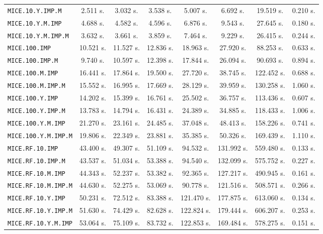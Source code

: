 \begin{table}[htbp]
\begin{tabular}{|l|c|c|c|c|c|c|c|}
\texttt{MICE.10.Y.IMP.M} & 2.511 s. & 3.032 s. & 3.538 s. & 5.007 s. & 6.692 s. & 19.519 s. & 0.210 s. \\
\texttt{MICE.10.Y.M.IMP} & 4.688 s. & 4.582 s. & 4.596 s. & 6.876 s. & 9.543 s. & 27.645 s. & 0.180 s. \\
\texttt{MICE.10.Y.M.IMP.M} & 3.632 s. & 3.661 s. & 3.859 s. & 7.464 s. & 9.229 s. & 26.415 s. & 0.244 s. \\
\texttt{MICE.100.IMP} & 10.521 s. & 11.527 s. & 12.836 s. & 18.963 s. & 27.920 s. & 88.253 s. & 0.633 s. \\
\texttt{MICE.100.IMP.M} & 9.740 s. & 10.597 s. & 12.398 s. & 17.844 s. & 26.094 s. & 90.693 s. & 0.894 s. \\
\texttt{MICE.100.M.IMP} & 16.441 s. & 17.864 s. & 19.500 s. & 27.720 s. & 38.745 s. & 122.452 s. & 0.688 s. \\
\texttt{MICE.100.M.IMP.M} & 15.552 s. & 16.995 s. & 17.669 s. & 28.129 s. & 39.959 s. & 130.258 s. & 1.060 s. \\
\texttt{MICE.100.Y.IMP} & 14.202 s. & 15.399 s. & 16.761 s. & 25.502 s. & 36.757 s. & 113.436 s. & 0.607 s. \\
\texttt{MICE.100.Y.IMP.M} & 13.783 s. & 14.794 s. & 16.431 s. & 24.389 s. & 34.885 s. & 118.433 s. & 1.006 s. \\
\texttt{MICE.100.Y.M.IMP} & 21.270 s. & 23.161 s. & 24.485 s. & 37.048 s. & 48.413 s. & 158.226 s. & 0.741 s. \\
\texttt{MICE.100.Y.M.IMP.M} & 19.806 s. & 22.349 s. & 23.881 s. & 35.385 s. & 50.326 s. & 169.439 s. & 1.110 s. \\
\texttt{MICE.RF.10.IMP} & 43.400 s. & 49.307 s. & 51.109 s. & 94.532 s. & 131.992 s. & 559.480 s. & 0.133 s. \\
\texttt{MICE.RF.10.IMP.M} & 43.537 s. & 51.034 s. & 53.388 s. & 94.540 s. & 132.099 s. & 575.752 s. & 0.227 s. \\
\texttt{MICE.RF.10.M.IMP} & 44.343 s. & 52.237 s. & 53.382 s. & 92.365 s. & 127.217 s. & 490.945 s. & 0.161 s. \\
\texttt{MICE.RF.10.M.IMP.M} & 44.630 s. & 52.275 s. & 53.069 s. & 90.778 s. & 121.516 s. & 508.571 s. & 0.266 s. \\
\texttt{MICE.RF.10.Y.IMP} & 50.231 s. & 72.512 s. & 83.388 s. & 121.470 s. & 177.875 s. & 613.060 s. & 0.134 s. \\
\texttt{MICE.RF.10.Y.IMP.M} & 51.630 s. & 74.429 s. & 82.628 s. & 122.824 s. & 179.444 s. & 606.207 s. & 0.253 s. \\
\texttt{MICE.RF.10.Y.M.IMP} & 53.064 s. & 75.109 s. & 83.732 s. & 122.853 s. & 169.484 s. & 578.275 s. & 0.151 s. \\

\end{tabular}
\end{table}
